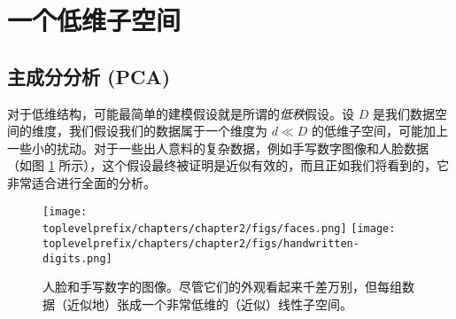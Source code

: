 \documentclass[../../book-main.tex]{subfiles}
\begin{document}








\section{一个低维子空间} \label{sec:lowrank}

\subsection{主成分分析 (PCA)}\label{sub:pca}

对于低维结构，可能最简单的建模假设就是所谓的\textit{低秩}假设。设 \(D\) 是我们数据空间的维度，我们假设我们的数据属于一个维度为 \(d \ll D\) 的低维子空间，可能加上一些小的扰动。对于一些出人意料的复杂数据，例如手写数字图像和人脸数据 \cite{BasriR2003-PAMI}（如图 \ref{fig:faces-digits} 所示），这个假设最终被证明是近似有效的，而且正如我们将看到的，它非常适合进行全面的分析。

\begin{figure}
    \centering
    \texttt{[image: \\toplevelprefix/chapters/chapter2/figs/faces.png]}
    \hspace{5mm} \texttt{[image: \\toplevelprefix/chapters/chapter2/figs/handwritten-digits.png]}   
    \caption{人脸和手写数字的图像。尽管它们的外观看起来千差万别，但每组数据（近似地）张成一个非常低维的（近似）线性子空间。}
    \label{fig:faces-digits}
\end{figure}
\end{document}
